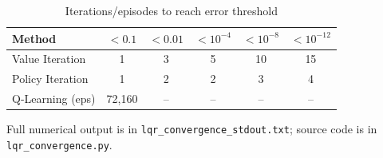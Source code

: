 \begin{table}[h!]
\centering
\caption{Iterations/episodes to reach error threshold}
\label{tab:iterations_to_threshold}
\begin{tabular}{l|c|c|c|c|c}
\hline
Method & $<0.1$ & $<0.01$ & $<10^{-4}$ & $<10^{-8}$ & $<10^{-12}$ \\
\hline
Value Iteration & 1 & 3 & 5 & 10 & 15 \\
Policy Iteration & 1 & 2 & 2 & 3 & 4 \\
Q-Learning (eps) & 72,160 & -- & -- & -- & -- \\
\hline
\end{tabular}
\end{table}

Full numerical output is in \texttt{lqr\_convergence\_stdout.txt}; source code is in \texttt{lqr\_convergence.py}.
